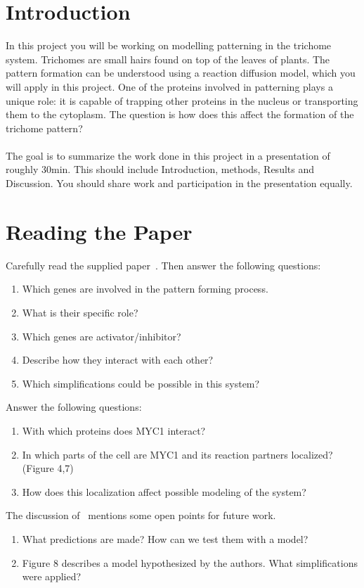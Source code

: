 \section{Introduction}
In this project you will be working on modelling patterning in the trichome system.
Trichomes are small hairs found on top of the leaves of plants.
The pattern formation can be understood using a reaction diffusion model, which you will apply in this project.
One of the proteins involved in patterning plays a unique role: it is capable of trapping other proteins in the nucleus or transporting them to the cytoplasm.
The question is how does this affect the formation of the trichome pattern?\\\\
The goal is to summarize the work done in this project in a presentation of roughly 30min.
This should include Introduction, methods, Results and Discussion.
You should share work and participation in the presentation equally.
%
%
\section{Reading the Paper}
Carefully read the supplied paper~\cite{Pesch2013}.
Then answer the following questions:
\begin{enumerate}
    \item Which genes are involved in the pattern forming process.
    \item What is their specific role?
    \item Which genes are activator/inhibitor?
    \item Describe how they interact with each other?
    \item Which simplifications could be possible in this system?
\end{enumerate}
%
%
Answer the following questions:
\begin{enumerate}
    \item With which proteins does MYC1 interact?
    \item In which parts of the cell are MYC1 and its reaction partners localized? (Figure 4,7)~\cite{Pesch2013}
    \item How does this localization affect possible modeling of the system?
\end{enumerate}
%
%
The discussion of~\cite{Pesch2013} mentions some open points for future work.
\begin{enumerate}
    \item What predictions are made?
    How can we test them with a model?
    \item Figure 8 describes a model hypothesized by the authors.
    What simplifications were applied?
\end{enumerate}
%
%
